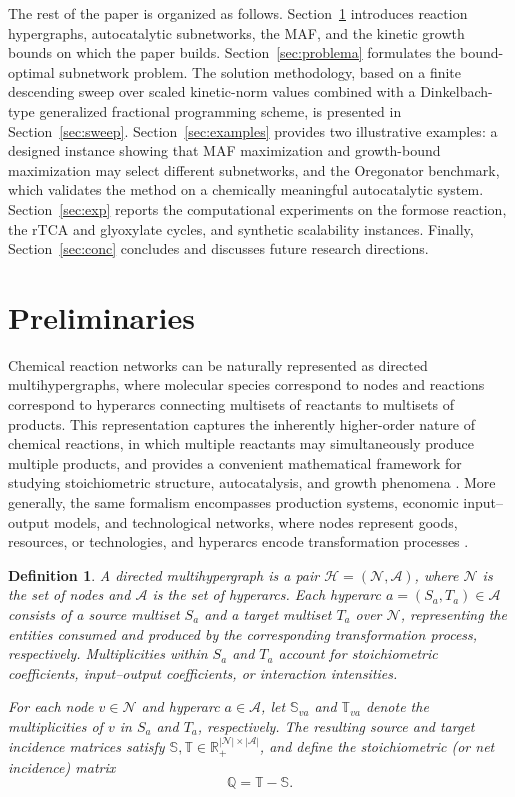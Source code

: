 \documentclass[a4paper,11pt,reqno]{amsart}
\newtheorem{definition}{Definition}[section]
\begin{document}
The rest of the paper is organized as follows. Section~\ref{sec:prelim} introduces reaction hypergraphs, autocatalytic subnetworks, the MAF, and the kinetic growth bounds on which the paper builds. Section~\ref{sec:problema} formulates the bound-optimal subnetwork problem.
The solution methodology, based on a finite descending sweep over scaled
kinetic-norm values combined with a Dinkelbach-type generalized fractional
programming scheme, is presented in Section~\ref{sec:sweep}.
Section~\ref{sec:examples} provides two illustrative
examples: a designed instance showing that MAF maximization and growth-bound
maximization may select different subnetworks, and the Oregonator benchmark,
which validates the method on a chemically meaningful autocatalytic system.
Section~\ref{sec:exp} reports the computational experiments on the formose
reaction, the rTCA and glyoxylate cycles, and synthetic scalability instances.
Finally, Section~\ref{sec:conc} concludes and discusses future research
directions.


\section{Preliminaries}\label{sec:prelim}

Chemical reaction networks can be naturally represented as directed multihypergraphs, where molecular species correspond to nodes and reactions correspond to hyperarcs connecting multisets of reactants to multisets of products. This representation captures the inherently higher-order nature of chemical reactions, in which multiple reactants may simultaneously produce multiple products, and provides a convenient mathematical framework for studying stoichiometric structure, autocatalysis, and growth phenomena \citep{feinberg2019foundations,gonzalez2024maf}. More generally, the same formalism encompasses production systems, economic input--output models, and technological networks, where nodes represent goods, resources, or technologies, and hyperarcs encode transformation processes \citep{klamt2009hypergraphs,battiston2021physics,bick2023higher}.

\begin{definition}\label{def:hypergraph}
A \emph{directed multihypergraph} is a pair
$\mathcal{H}=(\mathcal{N},\mathcal{A})$, where $\mathcal{N}$ is the set of
nodes and $\mathcal{A}$ is the set of hyperarcs. Each hyperarc
$a=(S_a,T_a)\in\mathcal{A}$ consists of a source multiset $S_a$ and a target
multiset $T_a$ over $\mathcal{N}$, representing the entities consumed and
produced by the corresponding transformation process, respectively.
Multiplicities within $S_a$ and $T_a$ account for stoichiometric coefficients,
input--output coefficients, or interaction intensities.

For each node $v\in\mathcal{N}$ and hyperarc $a\in\mathcal{A}$, let
$\mathbb{S}_{va}$ and $\mathbb{T}_{va}$ denote the multiplicities of $v$ in
$S_a$ and $T_a$, respectively. The resulting source and target incidence
matrices satisfy
$\mathbb{S},\mathbb{T}\in\mathbb{R}_{+}^{|\mathcal{N}|\times|\mathcal{A}|}$,
and define the \emph{stoichiometric} (or \emph{net incidence}) matrix
\[
\mathbb{Q}=\mathbb{T}-\mathbb{S}.
\]
\end{definition}
\end{document}
